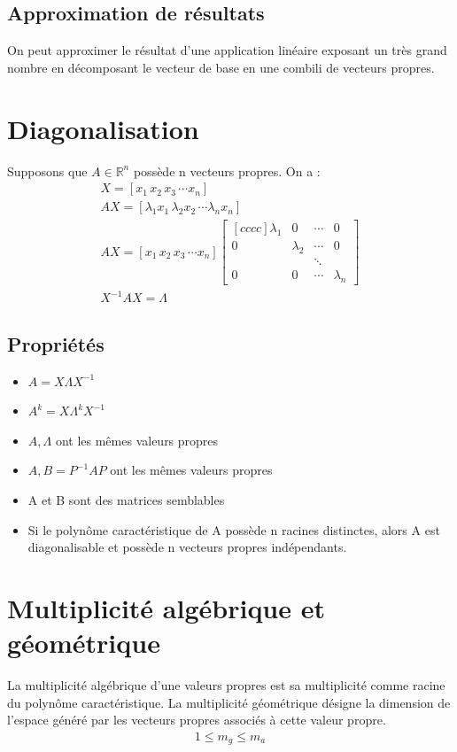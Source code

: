 \documentclass[a4paper]{book}
\begin{document}
\subsection{Approximation de résultats}
On peut approximer le résultat d'une application linéaire exposant un très grand nombre en décomposant le vecteur de base en une combili de vecteurs propres.
\section{Diagonalisation}
Supposons que $A \in \mathbb{R}^n$ possède n vecteurs propres. On a :
\begin{gather}
    X = [x_1\,x_2\,x_3\,\cdots x_n] \\
    AX = [\lambda_1x_1 \, \lambda_2x_2 \,\cdots \lambda_nx_n] \\
    AX = [x_1\,x_2\,x_3\,\cdots x_n] \begin{bmatrix}[cccc]
    \lambda_1&0&\cdots&0 \\
    0&\lambda_2&\cdots&0 \\
    &&\ddots& \\
    0&0&\cdots&\lambda_n
    \end{bmatrix} \\
    X^{-1}AX = \Lambda
\end{gather}
\subsection{Propriétés}
\begin{itemize}
    \item $A = X\Lambda X^{-1} $\\
    \item $A^k = X\Lambda^k X^{-1}$ \\
    \item $A,\Lambda$ ont les mêmes valeurs propres \\
    \item $A,B = P^{-1}AP$ ont les mêmes valeurs propres \\
    \item A et B sont des matrices semblables \\
    \item Si le polynôme caractéristique de A possède n racines distinctes, alors A est diagonalisable et possède n vecteurs propres indépendants.
\end{itemize}
\section{Multiplicité algébrique et géométrique}
La multiplicité algébrique d'une valeurs propres est sa multiplicité comme racine du polynôme caractéristique. La multiplicité géométrique désigne la dimension de l'espace généré par les vecteurs propres associés à cette valeur propre.
\begin{gather}
    1 \leq m_g \leq m_a
\end{gather}
\end{document}
